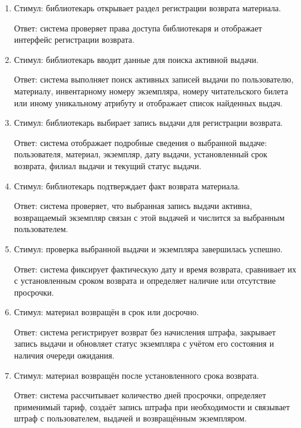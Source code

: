 \documentclass[12pt,a4paper]{article}
\begin{document}
	\begin{enumerate}
		\item Стимул: библиотекарь открывает раздел регистрации возврата материала.
		
		Ответ: система проверяет права доступа библиотекаря и отображает интерфейс
		регистрации возврата.
		
		\item Стимул: библиотекарь вводит данные для поиска активной выдачи.
		
		Ответ: система выполняет поиск активных записей выдачи по пользователю,
		материалу, инвентарному номеру экземпляра, номеру читательского билета
		или иному уникальному атрибуту и отображает список найденных выдач.
		
		\item Стимул: библиотекарь выбирает запись выдачи для регистрации возврата.
		
		Ответ: система отображает подробные сведения о выбранной выдаче:
		пользователя, материал, экземпляр, дату выдачи, установленный срок возврата,
		филиал выдачи и текущий статус выдачи.
		
		\item Стимул: библиотекарь подтверждает факт возврата материала.
		
		Ответ: система проверяет, что выбранная запись выдачи активна, возвращаемый
		экземпляр связан с этой выдачей и числится за выбранным пользователем.
		
		\item Стимул: проверка выбранной выдачи и экземпляра завершилась успешно.
		
		Ответ: система фиксирует фактическую дату и время возврата, сравнивает
		их с установленным сроком возврата и определяет наличие или отсутствие
		просрочки.
		
		\item Стимул: материал возвращён в срок или досрочно.
		
		Ответ: система регистрирует возврат без начисления штрафа, закрывает запись
		выдачи и обновляет статус экземпляра с учётом его состояния и наличия очереди
		ожидания.
		
		\item Стимул: материал возвращён после установленного срока возврата.
		
		Ответ: система рассчитывает количество дней просрочки, определяет применимый
		тариф, создаёт запись штрафа при необходимости и связывает штраф с пользователем,
		выдачей и возвращённым экземпляром.
		

\end{enumerate}
\end{document}
